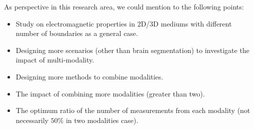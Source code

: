 As perspective in this research area, we could mention to the following points:
\begin{itemize}
\item Study on electromagnetic properties in 2D/3D mediums with different number of boundaries as a general case.
\item Designing more scenarios (other than brain segmentation) to investigate the impact of multi-modality.
\item Designing more methods to combine modalities.
\item The impact of combining more modalities (greater than two).
\item The optimum ratio of the number of measurements from each modality (not necessarily $50\%$ in two modalities case).
\end{itemize}    

